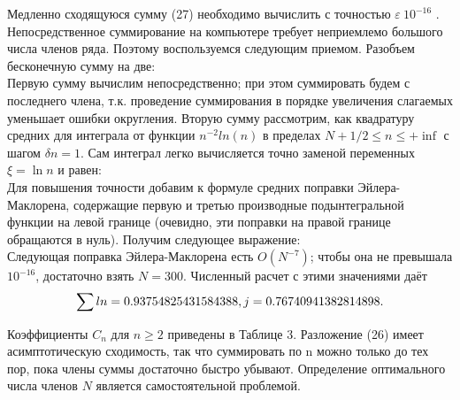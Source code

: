 Медленно сходящуюся сумму (27) необходимо вычислить с точностью $\varepsilon~10^{-16}$ .
Непосредственное суммирование на компьютере требует неприемлемо
большого числа членов ряда. Поэтому воспользуемся следующим приемом.
Разобъем бесконечную сумму на две:
\begin{equation}
\label{eq:ref_2_6_15}
\end{equation}
Первую сумму вычислим непосредственно; при этом суммировать будем с
последнего члена, т.к. проведение суммирования в порядке увеличения
слагаемых уменьшает ошибки округления. Вторую сумму рассмотрим, как
квадратуру средних для интеграла от функции $n^{-2}ln(n)$ в пределах
$N + 1/ 2 \leqslant n \leqslant +\inf$ с шагом $\delta n=1$. Сам интеграл легко вычисляется точно
заменой переменных $\xi=\ln n $ и равен:
\begin{equation}
\label{eq:ref_2_6_16}
\end{equation}
Для повышения точности добавим к формуле средних поправки Эйлера-
Маклорена, содержащие первую и третью производные подынтегральной
функции на левой границе (очевидно, эти поправки на правой границе
обращаются в нуль). Получим следующее выражение:
\begin{equation}
\label{eq:ref_2_6_17}
\end{equation}
Следующая поправка Эйлера-Маклорена есть $O(N^{-7})$; чтобы она не превышала
$10^{-16}$, достаточно взять $N = 300$. Численный расчет с этими значениями даёт
\begin{equation}
\sum ln = 0.93754825431584388,
\\
j = 0.76740941382814898.
\label{eq:ref_2_6_18}
\end{equation}

Коэффициенты $C_n$ для $n \geqslant 2$ приведены в Таблице 3. Разложение (26)
имеет асимптотическую сходимость, так что суммировать по n можно только
до тех пор, пока члены суммы достаточно быстро убывают. Определение
оптимального числа членов $N$ является самостоятельной проблемой.